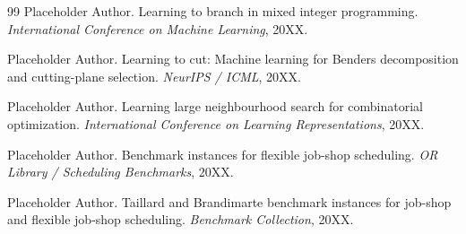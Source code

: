\documentclass[UTF8,12pt,a4paper]{ctexart}
\begin{document}
\begin{thebibliography}{99}
Placeholder Author. Learning to branch in mixed integer programming. \emph{International Conference on Machine Learning}, 20XX.

Placeholder Author. Learning to cut: Machine learning for Benders decomposition and cutting-plane selection. \emph{NeurIPS / ICML}, 20XX.

Placeholder Author. Learning large neighbourhood search for combinatorial optimization. \emph{International Conference on Learning Representations}, 20XX.

Placeholder Author. Benchmark instances for flexible job-shop scheduling. \emph{OR Library / Scheduling Benchmarks}, 20XX.

Placeholder Author. Taillard and Brandimarte benchmark instances for job-shop and flexible job-shop scheduling. \emph{Benchmark Collection}, 20XX.

\end{thebibliography}
\end{document}
